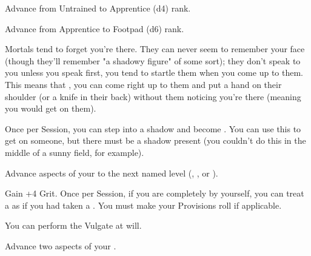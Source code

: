 \begin{multicols*}{2}


Advance  from Untrained to Apprentice (d4) rank.


Advance  from Apprentice to Footpad (d6) rank.



Mortals tend to forget you're there. They can never seem to remember your face (though they'll remember "a shadowy figure" of some sort); they don't speak to you unless you speak first, you tend to startle them when you come up to them. This means that , you can come right up to them and put a hand on their shoulder (or a knife in their back) without them noticing you're there (meaning you would get  on them). 


Once per Session, you can step into a shadow and become .  You can use this to get  on someone, but there must be a shadow present (you couldn't do this in the middle of a sunny field, for example).


Advance  aspects of your  to the next named level (\DEATH, \INJURY, or \INSANITY).


Gain +4 \MAX Grit. Once per Session, if you are completely by yourself, you can treat a  as if you had taken a . You must make your Provisions roll if applicable. 


You can perform the  Vulgate at will.


Advance two  aspects of your  \DCUP.


\end{multicols*}
